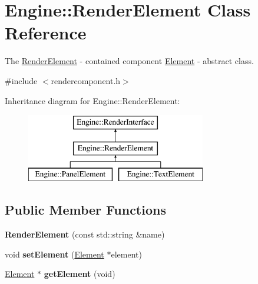 \hypertarget{classEngine_1_1RenderElement}{}\section{Engine\+:\+:Render\+Element Class Reference}
\label{classEngine_1_1RenderElement}


The \hyperlink{classEngine_1_1RenderElement}{Render\+Element} -\/ contained component \hyperlink{classEngine_1_1Element}{Element} -\/ abstract class.  




{\ttfamily \#include $<$rendercomponent.\+h$>$}

Inheritance diagram for Engine\+:\+:Render\+Element\+:\begin{figure}[H]
\begin{center}
\leavevmode
\includegraphics[height=3.000000cm]{classEngine_1_1RenderElement}
\end{center}
\end{figure}
\subsection*{Public Member Functions}
\begin{DoxyCompactItemize}
\item 
\hypertarget{classEngine_1_1RenderElement_adec31a17548437703c9cb8128e001ace}{}{\bfseries Render\+Element} (const std\+::string \&name)\label{classEngine_1_1RenderElement_adec31a17548437703c9cb8128e001ace}

\item 
\hypertarget{classEngine_1_1RenderElement_a885d6f55e3084a250f7ffec816166815}{}void {\bfseries set\+Element} (\hyperlink{classEngine_1_1Element}{Element} $\ast$element)\label{classEngine_1_1RenderElement_a885d6f55e3084a250f7ffec816166815}

\item 
\hypertarget{classEngine_1_1RenderElement_a5fb3b64eaadda98aeec7ca6ca0b9315c}{}\hyperlink{classEngine_1_1Element}{Element} $\ast$ {\bfseries get\+Element} (void)\label{classEngine_1_1RenderElement_a5fb3b64eaadda98aeec7ca6ca0b9315c}

\end{DoxyCompactItemize}

